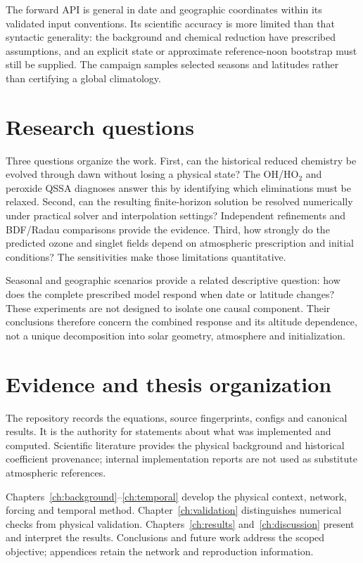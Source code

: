 The forward API is general in date and geographic coordinates within its validated input conventions. Its scientific accuracy is more limited than that syntactic generality: the background and chemical reduction have prescribed assumptions, and an explicit state or approximate reference-noon bootstrap must still be supplied. The campaign samples selected seasons and latitudes rather than certifying a global climatology.

\section{Research questions}
Three questions organize the work. First, can the historical reduced chemistry be evolved through dawn without losing a physical state? The OH/HO$_2$ and peroxide QSSA diagnoses answer this by identifying which eliminations must be relaxed. Second, can the resulting finite-horizon solution be resolved numerically under practical solver and interpolation settings? Independent refinements and BDF/Radau comparisons provide the evidence. Third, how strongly do the predicted ozone and singlet fields depend on atmospheric prescription and initial conditions? The sensitivities make those limitations quantitative.

Seasonal and geographic scenarios provide a related descriptive question: how does the complete prescribed model respond when date or latitude changes? These experiments are not designed to isolate one causal component. Their conclusions therefore concern the combined response and its altitude dependence, not a unique decomposition into solar geometry, atmosphere and initialization.

\section{Evidence and thesis organization}
The repository records the equations, source fingerprints, configs and canonical results. It is the authority for statements about what was implemented and computed. Scientific literature provides the physical background and historical coefficient provenance; internal implementation reports are not used as substitute atmospheric references.

Chapters~\ref{ch:background}--\ref{ch:temporal} develop the physical context, network, forcing and temporal method. Chapter~\ref{ch:validation} distinguishes numerical checks from physical validation. Chapters~\ref{ch:results} and~\ref{ch:discussion} present and interpret the results. Conclusions and future work address the scoped objective; appendices retain the network and reproduction information.
